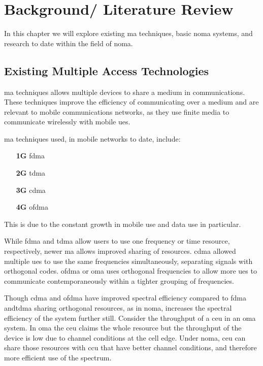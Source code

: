 \chapter{Background/ Literature Review}
In this chapter we will explore existing \ac{ma} techniques, basic \ac{noma} systems, and research to date within the field of \ac{noma}.

\section{Existing Multiple Access Technologies}

\ac{ma} techniques allows multiple devices to share a medium in communications.
These techniques improve the efficiency of communicating over a medium and are relevant to mobile communications networks, as they use finite media to communicate wirelessly with mobile \acp{ue}.

\par
\ac{ma} techniques used, in mobile networks to date, include:

\begin{itemize}
	\item[\textbf{1G}] \ac{fdma}
	\item[\textbf{2G}] \ac{tdma}
	\item[\textbf{3G}] \ac{cdma}
	\item[\textbf{4G}] \ac{ofdma}
\end{itemize}

\par
This is due to the constant growth in mobile use and data use in particular.

\par
While \ac{fdma} and \ac{tdma} allow users to use one frequency or time resource, respectively, newer \ac{ma} allows improved sharing of resources.
\ac{cdma} allowed multiple \acp{ue} to use the same frequencies simultaneously, separating signals with orthogonal codes.
\ac{ofdma} or \ac{oma} uses orthogonal frequencies to allow more \acp{ue} to communicate contemporaneously within a tighter grouping of frequencies.

\par
Though \ac{cdma} and \ac{ofdma} have improved spectral efficiency compared to \ac{fdma} and\ac{tdma} sharing orthogonal resources, as in \ac{noma}, increases the spectral efficiency of the system further still.
Consider the throughput of a \ac{ceu} in an \ac{oma} system.
In \ac{oma} the \ac{ceu} claims the whole resource but the throughput of the device is low due to channel conditions at the cell edge.
Under \ac{noma}, \ac{ceu} can share those resources with \ac{ccu} that have better channel conditions, and therefore more efficient use of the spectrum.

